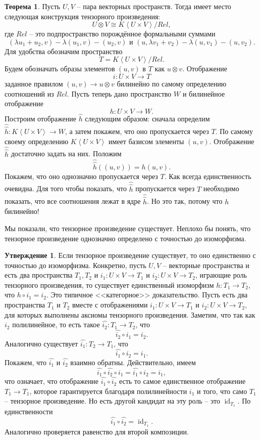 \documentclass[10pt,a4paper,oneside]{book}
\theoremstyle{definition}
\newtheorem{thm}{\color{red!40!black}Теорема}
\newtheorem{utvr}{\color{blue!50!black}Утверждение}
\newcommand{\id}{\operatorname{id}}
\def\lan{\left\langle }
\def\ran{\right\rangle}
\def\thrm{\begin{thm}}
\def\ethrm{\end{thm}}
\def\utv{\begin{utvr}}
\def\eutv{\end{utvr}}
\begin{document}
\thrm Пусть $U,V$ -- пара векторных пространств. Тогда имеет место следующая конструкция тензорного произведения:
$$U \otimes V \cong K\lan U \times V \ran / Rel,$$
где $Rel$ -- это подпространство порождённое формальными суммами
$$(\lambda u_1+u_2, v) - \lambda (u_1, v) - ( u_2,v) \text{ и } (u,\lambda v_1+v_2) - \lambda (u,v_1) - (u,v_2).$$ 
\proof Для удобства обозначим пространство
$$T=K\lan U \times V \ran / Rel.$$ Будем обозначать образы элементов $(u,v)$ в $T$ как  $u\otimes v$. Отображение $$i \colon U\times V \to T$$
заданное правилом  $(u,v) \to u \otimes v$
билинейно по самому определению соотношений из $Rel$. Пусть теперь дано пространство $W$ и билинейное отображение $$h \colon U \times V \to W.$$
Построим отображение $\hat{h}$ следующим образом: сначала определим $\hat{\hat{h}}\colon K\lan U \times V \ran \to W$, а затем покажем, что оно пропускается через $T$. По самому своему определению $K\lan U \times V\ran$ имеет базисом элементы $(u,v)$. Отображение $\hat{\hat{h}}$ достаточно задать на них. Положим $$\hat{\hat{h}}((u,v))=h(u,v).$$
Покажем, что оно однозначно пропускается через $T$. Как всегда единственность очевидна. Для того чтобы показать, что $\hat{\hat{h}}$ пропускается через $T$ необходимо показать, что все соотношения лежат в ядре $\hat{\hat{h}}$. Но это так, потому что $h$ билинейно! 
\endproof
\ethrm




Мы показали, что тензорное произведение существует. Неплохо бы понять, что тензорное произведение однозначно определено с точностью до изоморфизма. 


\utv Если тензорное произведение существует, то оно единственно с точностью до изоморфизма. Конкретно, пусть $U,V$ -- векторные пространства и есть два пространства $T_1,T_2$ и $i_1 \colon U\times V \to T_1$ и $i_2\colon U\times V \to T_2$, играющие роль тензорного произведения, то существует единственный изоморфизм $h\colon T_1\to T_2$, что $h\circ i_1=i_2$.
\proof Это типичное <<категорное>> доказательство. Пусть есть два пространства $T_1$ и $T_2$ вместе с отображениями $i_1 \colon U\times V \to T_1$ и $i_2 \colon  U\times V \to T_2$, для которых выполнены аксиомы тензорного произведения. Заметим, что так как $i_2$ полилинейное, то есть такое $\hat{i_2} \colon T_1 \to T_2$, что $$\hat{i_2}\circ i_1= i_2.$$ 
Аналогично существует $\hat{i_1} \colon T_2 \to T_1$, что
$$\hat{i_1}\circ i_2= i_1.$$ 
Покажем, что $\hat{i_1} $ и $\hat{i_2}$ взаимно обратны. Действительно, имеем
$$\hat{i_1}\circ \hat{i_2}\circ i_1= \hat{i_1}\circ i_2= i_1,$$
что означает, что отображение $\hat{i_1}\circ \hat{i_2}$ есть то самое единственное отображение $T_1\to T_1$, которое гарантируется благодаря полилинейности $i_1$ и того, что само $T_1$ -- тензорное произведение. Но есть другой кандидат на эту роль -- это $\id_{T_1}$. По единственности 
$$\hat{i_1}\circ \hat{i_2}=\id_{T_1}.$$
Аналогично проверяется равенство для второй композиции.
\endproof
\eutv
\end{document}
